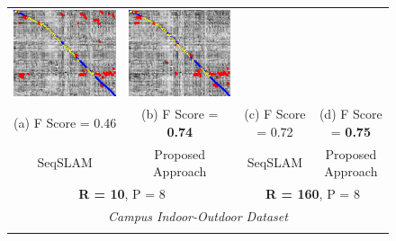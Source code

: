 \documentclass[letterpaper, 10 pt, conference]{ieeeconf}  %
\begin{document}
\begin{figure}[!h]
\begin{tabular*}{\textwidth}[t]{cccc}
  \includegraphics[width=\imgW,height=\imgH]{campus-io-without-good-105} &
  \includegraphics[width=\imgW,height=\imgH]{campus-io-with-good-75} \\
  (a) F Score = 0.46 & (b) F Score = \textbf{0.74} & (c) F Score = 0.72 & (d) F Score = \textbf{0.75} \\
  SeqSLAM & Proposed Approach & SeqSLAM & Proposed Approach \\
  \multicolumn{2}{c}{\textbf{R = 10}, P = 8} & \multicolumn{2}{c}{\textbf{R = 160}, P = 8} \\
  \multicolumn{4}{c}{\emph{Campus Indoor-Outdoor Dataset}} \\
  \\

\end{tabular*}
\end{figure}
\end{document}
